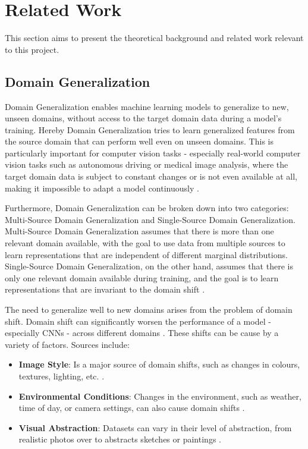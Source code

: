 \section{Related Work}
This section aims to present the theoretical background and related work relevant to this project.
\subsection{Domain Generalization}
Domain Generalization enables machine learning models to generalize to new, unseen domains, without access to the target domain data during a model's training. Hereby Domain Generalization tries to learn generalized features from the source domain that can perform well even on unseen domains. This is particularly important for computer vision tasks - especially real-world computer vision tasks such as autonomous driving or medical image analysis, where the target domain data is subject to constant changes or is not even available at all, making it impossible to adapt a model continuously \citep{liDeeperBroaderArtier2017,liuDEJAVUContinual2023,blanchardGeneralizingSeveralRelated2011}.

Furthermore, Domain Generalization can be broken down into two categories: Multi-Source Domain Generalization and Single-Source Domain Generalization.
Multi-Source Domain Generalization assumes that there is more than one relevant domain available, with the goal to use data from multiple sources to learn representations that are independent of different marginal distributions. Single-Source Domain Generalization, on the other hand, assumes that there is only one relevant domain available during training, and the goal is to learn representations that are invariant to the domain shift  \citep{blanchardGeneralizingSeveralRelated2011}.

The need to generalize well to new domains arises from the problem of domain shift. Domain shift can significantly worsen the performance of a model - especially CNNs - across different domains \citep{muandetDomainGeneralizationInvariant2013}. These shifts can be cause by a variety of factors. Sources include:
\begin{itemize}
    \item \textbf{Image Style}: Is a major source of domain shifts, such as changes in colours, textures, lighting, etc. \citep{zhouMixStyleNeuralNetworks2023}.
    \item \textbf{Environmental Conditions}: Changes in the environment, such as weather, time of day, or camera settings, can also cause domain shifts \citep{schwonbergAugmentationbasedDomainGeneralization2023}.
    \item \textbf{Visual Abstraction}: Datasets can vary in their level of abstraction, from realistic photos over to abstracts sketches or paintings \citep{liDeeperBroaderArtier2017}.
\end{itemize}

